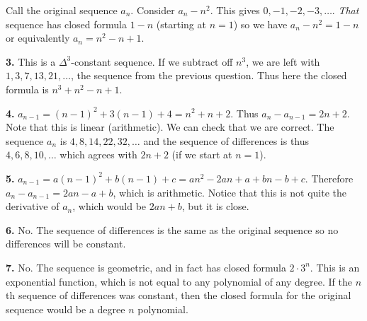 \documentclass[10pt,]{book}
\theoremstyle{plain}
\theoremstyle{definition}
\theoremstyle{definition}
\theoremstyle{definition}
\numberwithin{equation}{chapter}
\begin{document}
Call the original sequence \(a_n\). Consider \(a_n - n^2\). This gives \(0, -1, -2, -3, \ldots\). \emph{That} sequence has closed formula \(1-n\) (starting at \(n = 1\)) so we have \(a_n - n^2 = 1-n\) or equivalently \(a_n = n^2 - n + 1\).
%
\par\smallskip
\noindent\textbf{3.}\quad{}
This is a \(\Delta^3\)-constant sequence. If we subtract off \(n^3\), we are left with \(1, 3, 7, 13, 21, \ldots\), the sequence from the previous question. Thus here the closed formula is \(n^3 + n^2 - n + 1\).
%
\par\smallskip
\noindent\textbf{4.}\quad{}
\(a_{n-1} = (n-1)^2 + 3(n-1) + 4 = n^2 + n + 2\). Thus \(a_n - a_{n-1} = 2n+2\). Note that this is linear (arithmetic). We can check that we are correct. The sequence \(a_n\) is \(4, 8, 14, 22, 32, \ldots\) and the sequence of differences is thus \(4, 6, 8, 10,\ldots\) which agrees with \(2n+2\) (if we start at \(n = 1\)).
%
\par\smallskip
\noindent\textbf{5.}\quad{}
\(a_{n-1} = a(n-1)^2 + b(n-1) + c = an^2 - 2an + a + bn - b + c\). Therefore \(a_n - a_{n-1} = 2an - a + b\), which is arithmetic. Notice that this is not quite the derivative of \(a_n\), which would be \(2an + b\), but it is close.
%
\par\smallskip
\noindent\textbf{6.}\quad{}
No. The sequence of differences is the same as the original sequence so no differences will be constant.
%
\par\smallskip
\noindent\textbf{7.}\quad{}
No. The sequence is geometric, and in fact has closed formula \(2\cdot 3^n\). This is an exponential function, which is not equal to any polynomial of any degree. If the \(n\)th sequence of differences was constant, then the closed formula for the original sequence would be a degree \(n\) polynomial.
%
\par\smallskip
\end{document}
